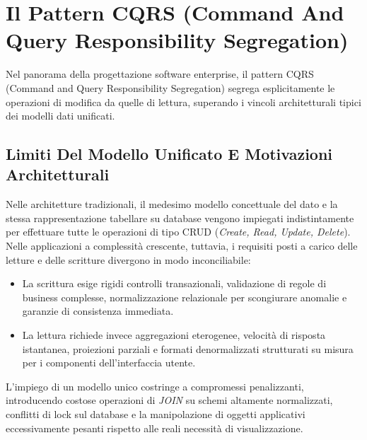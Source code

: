 \documentclass[11pt, a4paper]{article}
\begin{document}
\newpage

\section{Il Pattern CQRS (Command And Query Responsibility Segregation)}

Nel panorama della progettazione software enterprise, il pattern CQRS (Command and Query Responsibility Segregation) segrega esplicitamente le operazioni di modifica da quelle di lettura, superando i vincoli architetturali tipici dei modelli dati unificati.

\subsection{Limiti Del Modello Unificato E Motivazioni Architetturali}

Nelle architetture tradizionali, il medesimo modello concettuale del dato e la stessa rappresentazione tabellare su database vengono impiegati indistintamente per effettuare tutte le operazioni di tipo CRUD (\emph{Create, Read, Update, Delete}). Nelle applicazioni a complessità crescente, tuttavia, i requisiti posti a carico delle letture e delle scritture divergono in modo inconciliabile:
\begin{itemize}[noitemsep]
    \item La scrittura esige rigidi controlli transazionali, validazione di regole di business complesse, normalizzazione relazionale per scongiurare anomalie e garanzie di consistenza immediata.
    \item La lettura richiede invece aggregazioni eterogenee, velocità di risposta istantanea, proiezioni parziali e formati denormalizzati strutturati su misura per i componenti dell'interfaccia utente.
\end{itemize}

L'impiego di un modello unico costringe a compromessi penalizzanti, introducendo costose operazioni di \emph{JOIN} su schemi altamente normalizzati, conflitti di lock sul database e la manipolazione di oggetti applicativi eccessivamente pesanti rispetto alle reali necessità di visualizzazione.
\end{document}
